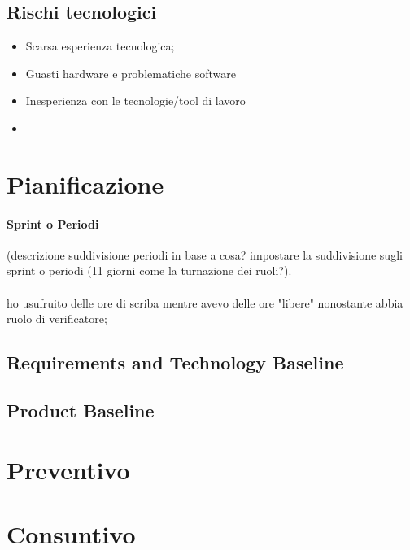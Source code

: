 \documentclass[10pt, a4paper]{article}
\begin{document}
{{{{{%

\subsection{Rischi tecnologici}
\begin{itemize}
    \item Scarsa esperienza tecnologica;
    \item Guasti hardware e problematiche software
\end{itemize}
\begin{itemize}
    \item Inesperienza con le tecnologie/tool di lavoro
    \item
\end{itemize}


\section{Pianificazione}
\color{gray}\paragraph{Sprint o Periodi}
(descrizione suddivisione periodi in base a cosa? impostare la suddivisione sugli sprint o periodi (11 giorni come la turnazione dei ruoli?).
\paragraph{}ho usufruito delle ore di scriba mentre avevo delle ore "libere" nonostante abbia ruolo di verificatore;
\color{black}
\subsection{Requirements and Technology Baseline}

\subsection{Product Baseline}


\section{Preventivo}




\section{Consuntivo}

}}}}}
\end{document}
